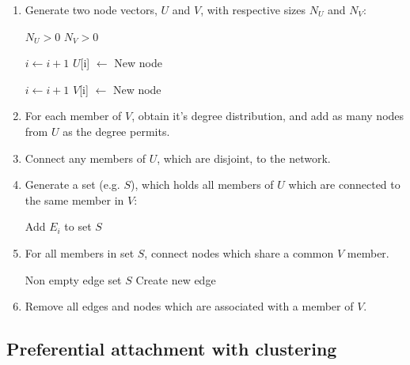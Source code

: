 \documentclass[a4paper,11pt,titlepage]{article}
\begin{document}
\begin{enumerate}
  \item Generate two node vectors, $U$ and $V$, with respective
        sizes $N_U$ and $N_V$:

    \begin{algorithmic}
      \REQUIRE $N_U > 0$
      \REQUIRE $N_V > 0$

        \STATE $i \gets i + 1$
        \STATE $U$[i] $\gets$ New node
      \ENDFOR

        \STATE $i \gets i + 1$
        \STATE $V$[i] $\gets$ New node
      \ENDFOR
    \end{algorithmic}

  \item For each member of $V$, obtain it's degree distribution,
        and add as many nodes from $U$ as the degree permits.

  \item Connect any members of $U$, which are disjoint, to the network.

  \item Generate a set (e.g. $S$), which holds all members of
        $U$ which are connected to the same member in $V$:

  \begin{algorithmic}
        \STATE Add $E_i$ to set $S$
      \ENDIF
    \ENDFOR
  \end{algorithmic}

  \item For all members in set $S$, connect nodes which share
        a common $V$ member.

  \begin{algorithmic}
    \REQUIRE Non empty edge set $S$
          \STATE Create new edge
        \ENDIF
      \ENDFOR
    \ENDFOR
  \end{algorithmic}

  \item Remove all edges and nodes which are associated with
        a member of $V$.

\end{enumerate}

\subsection{Preferential attachment with clustering}
\end{document}
